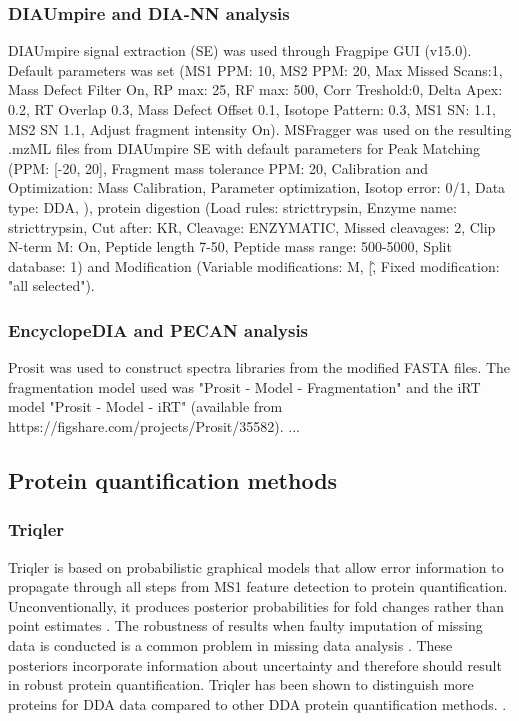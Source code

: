 \documentclass[10pt,letterpaper]{article}
\begin{document}
\subsubsection*{DIAUmpire and DIA-NN analysis}
DIAUmpire signal extraction (SE) was used through Fragpipe GUI (v15.0). Default parameters was set (MS1 PPM: 10, MS2 PPM: 20, Max Missed Scans:1, Mass Defect Filter On, RP max: 25, RF max: 500, Corr Treshold:0, Delta Apex: 0.2, RT Overlap 0.3, Mass Defect Offset 0.1, Isotope Pattern: 0.3, MS1 SN: 1.1, MS2 SN 1.1, Adjust fragment intensity On). MSFragger was used on the resulting .mzML files from DIAUmpire SE with default parameters for Peak Matching (PPM: [-20, 20], Fragment mass tolerance PPM: 20, Calibration and Optimization: Mass Calibration, Parameter optimization, Isotop error: 0/1, Data type: DDA, ), protein digestion (Load rules: stricttrypsin, Enzyme name: stricttrypsin, Cut after: KR, Cleavage: ENZYMATIC, Missed cleavages: 2, Clip N-term M: On, Peptide length 7-50, Peptide mass range: 500-5000, Split database: 1) and Modification (Variable modifications: M, \/[\^, Fixed modification: "all selected"). 

\subsubsection*{EncyclopeDIA and PECAN analysis}
Prosit was used to construct spectra libraries from the modified FASTA files. The fragmentation model used was "Prosit - Model - Fragmentation" and the iRT model "Prosit - Model - iRT" (available from https://figshare.com/projects/Prosit/35582).
...

\subsection*{Protein quantification methods}

\subsubsection*{Triqler}

Triqler is based on probabilistic graphical models that allow error information to propagate through all steps from MS1 feature detection to protein quantification. Unconventionally, it produces posterior probabilities for fold changes rather than point estimates \cite{The2018Integrated}. The robustness of results when faulty imputation of missing data is conducted is a common problem in missing data analysis \cite{ma2018bayesian}. These posteriors incorporate information about uncertainty and therefore should result in robust protein quantification. Triqler has been shown to distinguish more proteins for DDA data compared to other DDA protein quantification methods. \cite{The2018Integrated}. 
\end{document}
